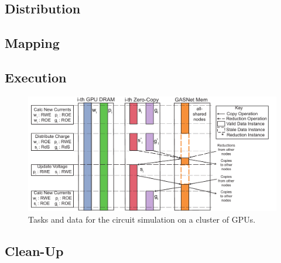 \subsection{Distribution}
\label{sec:dist}

\subsection{Mapping}
\label{sec:map}

\subsection{Execution}
\label{sec:exec}

\begin{figure}
\includegraphics[scale=0.48]{figs/CircuitMem.pdf}
\caption{Tasks and data for the circuit simulation on a cluster of GPUs.}
\end{figure}

\subsection{Clean-Up}
\label{sec:clean}

